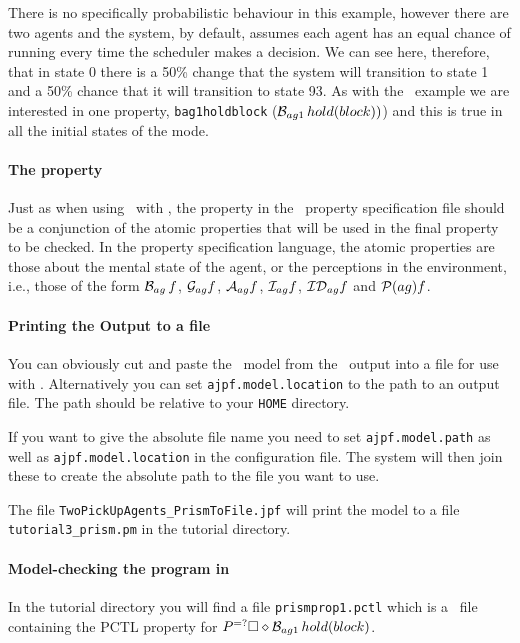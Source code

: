 \documentclass[a4]{article}
\begin{document}
There is no specifically probabilistic behaviour in this example, however there are two agents and the system, by default, assumes each agent has an equal chance of running every time the scheduler makes a decision.  We can see here, therefore, that in state 0 there is a 50\% change that the system will transition to state 1 and a 50\% chance that it will transition to state 93.  As with the \spin\ example we are interested in one property, \texttt{bag1holdblock} ($\mathrm{{\cal B}}_{ag1} \, hold(block))$) and this is true in all the initial states of the mode.

\paragraph{The property} Just as when using \ajpf\ with \spin, the property in the \ajpf\ property specification file should be a conjunction of the atomic properties that will be used in the final property to be checked.  In the property specification language, the atomic properties are those about the mental state of the agent, or the perceptions in the environment, i.e., those of the form $\mathrm{{\cal B}}_{ag} \, f$, $\mathrm{{\cal G}}_{ag} f$, $\mathrm{{\cal A}}_{ag} f$, $\mathrm{{\cal I}}_{ag} f$, $\mathrm{{\cal ID}}_{ag} f$ and $\mathrm{{\cal P}}(ag){f}$.

\paragraph{Printing the Output to a file} You can obviously cut and paste the \prism\ model from the \ajpf\ output into a file for use with \prism.  Alternatively you can set \texttt{ajpf.model.location} to the path to an output file.  The path should be relative to your \texttt{HOME} directory.  

If you want to give the absolute file name you need to set \texttt{ajpf.model.path} as well as \texttt{ajpf.model.location} in the configuration file.  The system will then join these to create the absolute path to the file you want to use.

The file \texttt{TwoPickUpAgents\_PrismToFile.jpf} will print the model to a file \texttt{tutorial3\_prism.pm} in the tutorial directory.

\paragraph{Model-checking the program in \prism}  In the tutorial directory you will find a file \texttt{prismprop1.pctl} which is a \prism\ file containing the PCTL property for $P^{=?}\Box \diamond \mathrm{{\cal B}}_{ag1} \, hold(block)$.  
\end{document}
